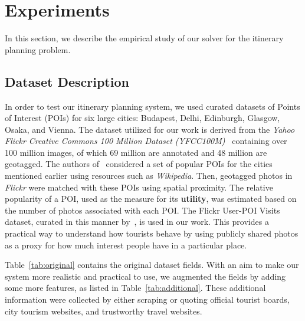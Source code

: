 \section{Experiments}
\label{sec:experiments}

In this section, we describe the empirical study of our \trip solver for the itinerary planning problem.

\subsection{Dataset Description}
\label{sec:dataset}

In order to test our itinerary planning system, we used curated datasets of Points of Interest (POIs) for six large cities: Budapest, Delhi, Edinburgh, Glasgow, Osaka, and Vienna. 
The dataset utilized for our work is derived from the \emph{Yahoo Flickr Creative Commons 100 Million Dataset (YFCC100M)}~\cite{taylor2018tour} containing over 100 million images, of which 69 million are annotated and 48 million are geotagged.
%
The authors of~\cite{taylor2018tour} considered a set of popular POIs for the cities mentioned earlier using resources such as \emph{Wikipedia}. Then, geotagged photos in \emph{Flickr} were matched with these POIs using spatial proximity. The relative popularity of a POI, used as the measure for its \textbf{utility}, was estimated based on the number of photos associated with each POI. The Flickr User-POI Visits dataset, curated in this manner by~\cite{limkwanhuiDataCode}, is used in our work.
This provides a practical way to understand how tourists behave by using publicly shared photos as a proxy for how much interest people have in a particular place.

Table~\ref{tab:original} contains the original dataset fields. With an aim to make our system more realistic and practical to use, we augmented the fields by adding some more features, as listed in Table~\ref{tab:additional}.
These additional information were collected by either scraping or quoting official tourist boards, city tourism websites, and trustworthy travel websites.

